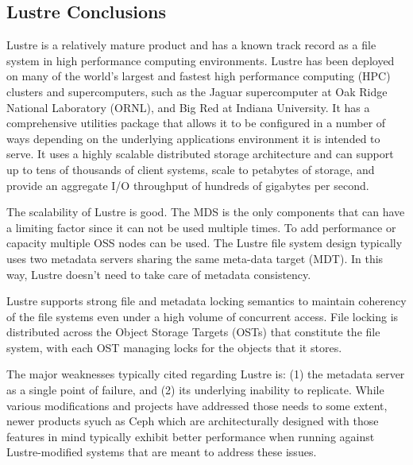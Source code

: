 \documentclass[11pt]{article}
\begin{document}
\subsection{Lustre Conclusions}
Lustre is a relatively mature product and has a known track record as 
a file system in high performance computing environments. Lustre has 
been deployed on many of the world’s largest and fastest high performance 
computing (HPC) clusters and supercomputers, such as the Jaguar 
supercomputer at Oak Ridge National Laboratory (ORNL), and Big Red at 
Indiana University. It has a comprehensive utilities package that allows 
it to be configured in a number of ways depending on the underlying 
applications environment it is intended to serve. It uses a highly 
scalable distributed storage architecture and can support up to
tens of thousands of client systems, scale to petabytes of storage, and 
provide an aggregate I/O throughput of hundreds of gigabytes per second.

The scalability of Lustre is good. The MDS is the only components that 
can have a limiting factor since it can not be used multiple times. To 
add performance or capacity multiple OSS nodes can be used. The Lustre 
file system design typically uses two metadata servers sharing the same 
meta-data target (MDT). In this way, Lustre doesn’t need to take care of 
metadata consistency.

Lustre supports strong file and metadata locking semantics to maintain 
coherency of the file systems even under a high volume of concurrent 
access. File locking is distributed across the Object Storage Targets 
(OSTs) that constitute the file system, with each OST managing locks 
for the objects that it stores.

The major weaknesses typically cited regarding Lustre is: (1) the 
metadata server as a single point of failure, and (2) its underlying 
inability to replicate. While various modifications and projects have 
addressed those needs to some extent, newer products syuch as Ceph 
which are architecturally designed with those features in mind typically 
exhibit better performance when running against Lustre-modified systems 
that are meant to address these issues. 
\end{document}
